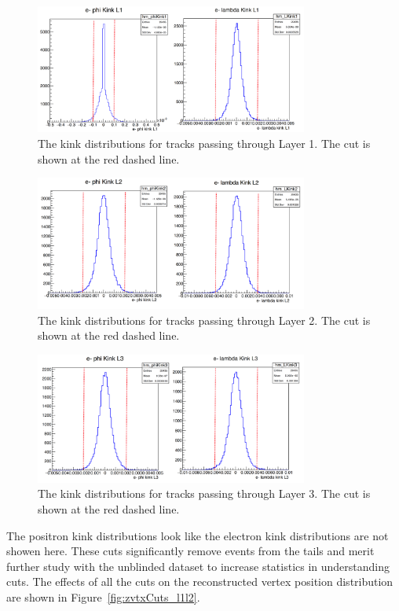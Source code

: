 \begin{figure}[H]
  \centering
      \includegraphics[width=0.8\textwidth]{plots/kink1.png}
  \caption{The kink distributions for tracks passing through Layer 1. The cut is shown at the red dashed line.}
  \label{fig:kink1}
\end{figure} 
\begin{figure}[H]
  \centering
      \includegraphics[width=0.8\textwidth]{plots/kink2.png}
  \caption{The kink distributions for tracks passing through Layer 2. The cut is shown at the red dashed line.}
  \label{fig:kink2}
\end{figure} 
\begin{figure}[H]
  \centering
      \includegraphics[width=0.8\textwidth]{plots/kink3.png}
  \caption{The kink distributions for tracks passing through Layer 3. The cut is shown at the red dashed line.}
  \label{fig:kink3}
\end{figure} 

The positron kink distributions look like the electron kink distributions are not showen here. These cuts significantly remove events from the tails and merit further study with the unblinded dataset to increase statistics in understanding cuts. The effects of all the cuts on the reconstructed vertex position distribution are shown in Figure~\ref{fig:zvtxCuts_l1l2}.

